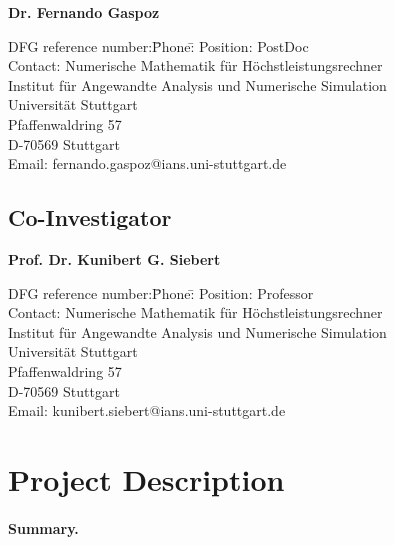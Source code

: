 \documentclass[enabledeprecatedfontcommands,cleardoublepage=empty,headsepline,twoside,11pt,DIV=15,BCOR=12mm,final]{scrartcl}
\begin{document}
\begin{flushleft}
  \textbf{Dr. Fernando Gaspoz}
  \begin{tabbing}
    DFG reference number:\quad\=Phone:\quad\=\kill
    Position:\> PostDoc\\
    Contact:\> Numerische Mathematik f\"ur H\"ochstleistungsrechner\\ 
    \>Institut f\"ur Angewandte Analysis und Numerische Simulation\\
    \> Universit\"at Stuttgart\\
    \> Pfaffenwaldring 57 \\
    \> D-70569 Stuttgart\\[1mm]
    \> Email:\> fernando.gaspoz@ians.uni-stuttgart.de\\[1mm]
 \end{tabbing}
\end{flushleft}

\subsection*{Co-Investigator}

\begin{flushleft}
  \textbf{Prof. Dr. Kunibert G. Siebert}
  \begin{tabbing}
    DFG reference number:\quad\=Phone:\quad\=\kill
    Position:\> Professor\\
    Contact:\> Numerische Mathematik f\"ur H\"ochstleistungsrechner\\ 
    \>Institut f\"ur Angewandte Analysis und Numerische Simulation\\
    \> Universit\"at Stuttgart\\
    \> Pfaffenwaldring 57 \\
    \> D-70569 Stuttgart\\[1mm]
    \> Email:\> kunibert.siebert@ians.uni-stuttgart.de\\[1mm]
 \end{tabbing}
\end{flushleft}
\section*{Project Description}

\paragraph{Summary.} 
\end{document}
